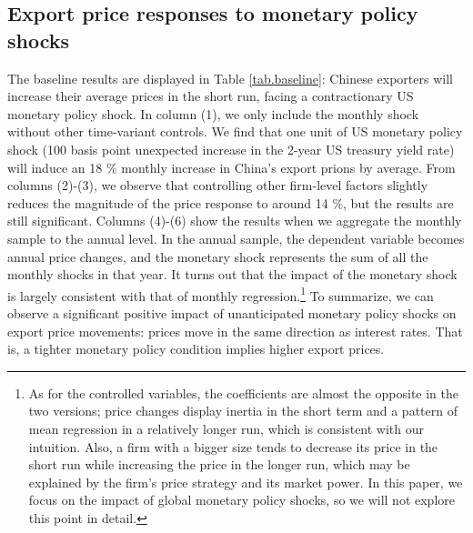 \subsection{Export price responses to monetary policy shocks}

The baseline results are displayed in Table \ref{tab.baseline}: Chinese exporters will increase their average prices in the short run, facing a contractionary US monetary policy shock.  In column (1), we only include the monthly shock without other time-variant controls. We find that one unit of US monetary policy shock (100 basis point unexpected increase in the 2-year US treasury yield rate) will induce an 18 $\%$ monthly increase in China's export prions by average. From columns (2)-(3), we observe that controlling other firm-level factors slightly reduces the magnitude of the price response to around 14 $\%$, but the results are still significant. Columns (4)-(6) show the results when we aggregate the monthly sample to the annual level. In the annual sample, the dependent variable becomes annual price changes, and the monetary shock represents the sum of all the monthly shocks in that year. It turns out that the impact of the monetary shock is largely consistent with that of monthly regression.\footnote{As for the controlled variables, the coefficients are almost the opposite in the two versions; price changes display inertia in the short term and a pattern of mean regression in a relatively longer run, which is consistent with our intuition. Also, a firm with a bigger size tends to decrease its price in the short run while increasing the price in the longer run, which may be explained by the firm's price strategy and its market power. In this paper, we focus on the impact of global monetary policy shocks, so we will not explore this point in detail.} To summarize, we can observe a significant positive impact of unanticipated monetary policy shocks on export price movements: prices move in the same direction as interest rates. That is, a tighter monetary policy condition implies higher export prices.

